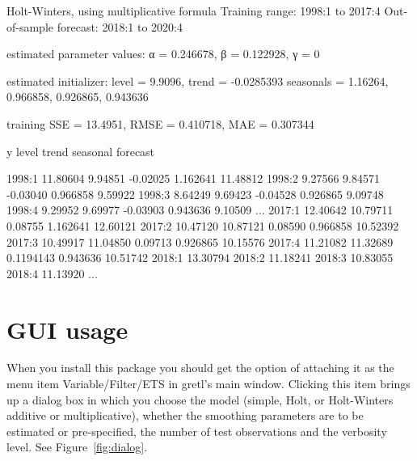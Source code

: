 \documentclass{article}
\begin{document}
\begin{script}[htbp]
  \caption{Partial listing of results from the Holt-Winters example in
    Section~\ref{sec:examples}: forecasts for 2018:1 and beyond are
    out-of-sample.}
  \label{list:results2}
\begin{code}
Holt-Winters, using multiplicative formula
Training range: 1998:1 to 2017:4
Out-of-sample forecast: 2018:1 to 2020:4

estimated parameter values:
  α = 0.246678, β = 0.122928, γ = 0

estimated initializer:
  level = 9.9096, trend = -0.0285393
  seasonals = {1.16264, 0.966858, 0.926865, 0.943636}

training SSE = 13.4951, RMSE = 0.410718, MAE = 0.307344

                  y        level        trend     seasonal     forecast

1998:1     11.80604      9.94851     -0.02025     1.162641     11.48812
1998:2      9.27566      9.84571     -0.03040     0.966858      9.59922
1998:3      8.64249      9.69423     -0.04528     0.926865      9.09748
1998:4      9.29952      9.69977     -0.03903     0.943636      9.10509
...
2017:1     12.40642     10.79711      0.08755     1.162641     12.60121
2017:2     10.47120     10.87121      0.08590     0.966858     10.52392
2017:3     10.49917     11.04850      0.09713     0.926865     10.15576
2017:4     11.21082     11.32689    0.1194143     0.943636     10.51742
2018:1                                                         13.30794
2018:2                                                         11.18241
2018:3                                                         10.83055
2018:4                                                         11.13920
...

\end{code}
\end{script}

\section{GUI usage}
\label{sec:gui}

When you install this package you should get the option of attaching it
as the menu item \textsf{Variable/Filter/ETS} in gretl's main
window. Clicking this item brings up a dialog box in which you choose
the model (simple, Holt, or Holt-Winters additive or multiplicative),
whether the smoothing parameters are to be estimated or pre-specified,
the number of test observations and the verbosity level. See
Figure~\ref{fig:dialog}.
\end{document}

